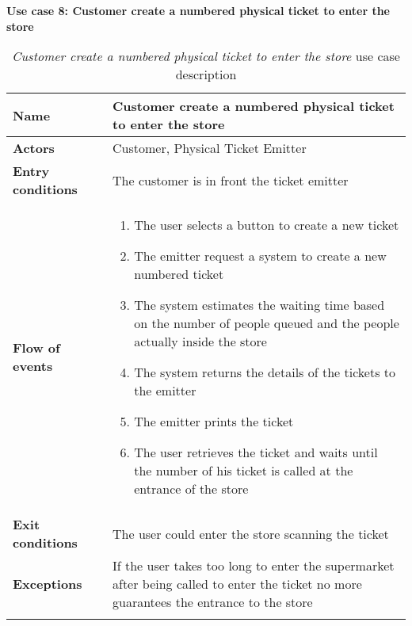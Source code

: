     \clearpage
    \textbf{Use case 8: Customer create a numbered physical ticket to enter the store}
    \smallskip
    \begin{longtable}{p{0.25\linewidth}p{0.75\linewidth}}
    \toprule
    \textbf{Name} & \textbf{Customer create a numbered physical ticket to enter the store} \\
    \midrule
    \textbf{Actors} & Customer, Physical Ticket Emitter \\
    \midrule
    \textbf{Entry conditions} & The customer is in front the ticket emitter\\
    \midrule
    \textbf{Flow of events} & 
    \begin{enumerate}
        \item The user selects a button to create a new ticket
        \item The emitter request a system to create a new numbered ticket
        \item The system estimates the waiting time based on the number of people queued and the people actually inside the store
        \item The system returns the details of the tickets to the emitter
        \item The emitter prints the ticket
        \item The user retrieves the ticket and waits until the number of his ticket is called at the entrance of the store
    \end{enumerate} \\
    \midrule
    \textbf{Exit conditions} & The user could enter the store scanning the ticket\\
    \midrule
    \textbf{Exceptions} & If the user takes too long to enter the supermarket after being called to enter the ticket no more guarantees the entrance to the store\\
    \bottomrule
    \caption{\emph{Customer create a numbered physical ticket to enter the store} use case description}
    \end{longtable}

